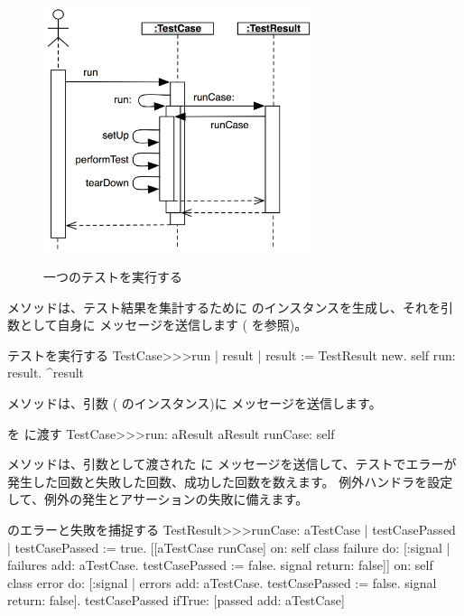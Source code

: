 \documentclass[a4paper,10pt,twoside]{book}
\begin{document}
\begin{figure}[tbh]
  \begin{center}
		{\includegraphics[width=0.7\textwidth]{sunit-scenario}}
	\caption{一つのテストを実行する}
  \end{center}
\end{figure}

 メソッドは、テスト結果を集計するために  のインスタンスを生成し、それを引数として自身に  メッセージを送信します
( を参照)。

\begin{method}[tastecaserun]{テストを実行する}
TestCase>>>run
	| result |
	result := TestResult new.
	self run: result.
	^result
\end{method}


 メソッドは、引数 ( のインスタンス)に  メッセージを送信します。

\begin{method}[testcaserun:]{ を  に渡す}
TestCase>>>run: aResult
	aResult runCase: self
\end{method}
 メソッドは、引数として渡された  に  メッセージを送信して、テストでエラーが発生した回数と失敗した回数、成功した回数を数えます。
例外ハンドラを設定して、例外の発生とアサーションの失敗に備えます。
\begin{method}[testresultruncase]{ のエラーと失敗を捕捉する}
TestResult>>>runCase: aTestCase
	| testCasePassed |
	testCasePassed := true.
	[[aTestCase runCase] 
			on: self class failure
			do: 
				[:signal | 
				failures add: aTestCase.
				testCasePassed := false.
				signal return: false]]
					on: self class error
					do:
						[:signal |
						errors add: aTestCase.
						testCasePassed := false.
						signal return: false].
	testCasePassed ifTrue: [passed add: aTestCase]
\end{method}
\end{document}
